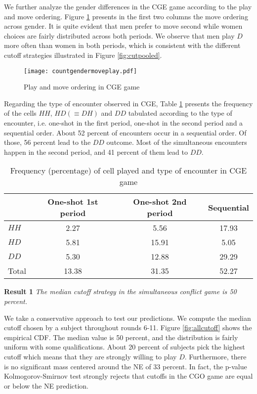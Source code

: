 \documentclass[12pt,english]{article}
\begin{document}
We further analyze the gender differences in the CGE game according to the play and move ordering. Figure \ref{fig:cgepooled} presents in the first two columns the move ordering across gender. It is quite evident that men prefer to move second while women choices are fairly distributed across both periods. We observe that men play $D$ more often than women in both periods, which is consistent with the different cutoff strategies illustrated in Figure \ref{fig:cutpooled}.
\begin{center}
\begin{figure}[ht]
\centering{}%
\texttt{[image: countgendermoveplay.pdf]}%
\caption{Play and move ordering in CGE game} 
\label{fig:cgepooled}
\end{figure}
\end{center}
Regarding the type of encounter observed in CGE, Table \ref{tab(CGE)} presents the frequency of the cells $HH$, $HD(\equiv DH)$ and $DD$ tabulated according to the type of encounter, i.e. one-shot in the first period, one-shot in the second period and a sequential order. About 52 percent of encounters occur in a sequential order. Of those, 56 percent lead to the $DD$ outcome. Most of the simultaneous encounters happen in the second period, and 41 percent of them lead to $DD$.  

\begin{table}[!t]
\centering
\begin{tabular}{lccc}

 & One-shot 1st period & One-shot 2nd period  & Sequential\\
  \hline
  $HH$ &  2.27 & 5.56 & 17.93 \\
  $HD$ & 5.81 & 15.91 & 5.05 \\
  $DD$& 5.30 & 12.88 & 29.29 \\
  \hline
Total & 13.38 & 31.35 & 52.27\\
\end{tabular}
\caption{Frequency (percentage) of cell played and type of encounter in CGE game }

\label{tab(CGE)}
\end{table}

\noindent \textbf{Result 1}
\textit{The median cutoff strategy in the simultaneous conflict game is 50 percent.}

We take a conservative approach to test our predictions. We compute the median cutoff chosen by a subject throughout rounds 6-11. Figure  \ref{fig:allcutoff} shows the empirical CDF. The median value is 50 percent, and the distribution is fairly uniform with some qualifications. About 20 percent of subjects pick the highest cutoff which means that they are strongly willing to play $D$. Furthermore, there is no significant mass centered around the NE of 33 percent. In fact, the p-value Kolmogorov-Smirnov test strongly rejects that cutoffs in the CGO game are equal or below the NE prediction. 
\end{document}
